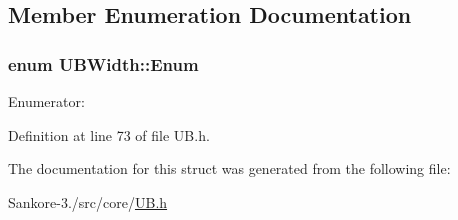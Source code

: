 \subsection{Member Enumeration Documentation}
\hypertarget{struct_u_b_width_a1cdf36b8767130b4ff112ac3feadab67}{
\subsubsection[{Enum}]{\setlength{\rightskip}{0pt plus 5cm}enum {\bf U\-B\-Width\-::\-Enum}}}\label{df/d79/struct_u_b_width_a1cdf36b8767130b4ff112ac3feadab67}
\begin{Desc}
\item[Enumerator\-: ]\par
\begin{description}
\item[{\em 
\hypertarget{struct_u_b_width_a1cdf36b8767130b4ff112ac3feadab67abb43f940763e125812657ceb49ba64c9}{Fine}\label{df/d79/struct_u_b_width_a1cdf36b8767130b4ff112ac3feadab67abb43f940763e125812657ceb49ba64c9}
}]\item[{\em 
\hypertarget{struct_u_b_width_a1cdf36b8767130b4ff112ac3feadab67a41a30f282cc204fc5b8e55cc1398033d}{Medium}\label{df/d79/struct_u_b_width_a1cdf36b8767130b4ff112ac3feadab67a41a30f282cc204fc5b8e55cc1398033d}
}]\item[{\em 
\hypertarget{struct_u_b_width_a1cdf36b8767130b4ff112ac3feadab67a2cf69ae460a76f183280dbbd957d48af}{Strong}\label{df/d79/struct_u_b_width_a1cdf36b8767130b4ff112ac3feadab67a2cf69ae460a76f183280dbbd957d48af}
}]\end{description}
\end{Desc}



Definition at line 73 of file U\-B.\-h.



The documentation for this struct was generated from the following file\-:\begin{DoxyCompactItemize}
\item 
Sankore-\/3./src/core/\hyperlink{_u_b_8h}{U\-B.\-h}\end{DoxyCompactItemize}
